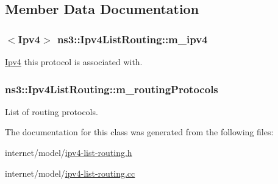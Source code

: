 \subsection{Member Data Documentation}
\subsubsection[{\texorpdfstring{m\+\_\+ipv4}{m_ipv4}}]{$<${\bf Ipv4}$>$ ns3\+::\+Ipv4\+List\+Routing\+::m\+\_\+ipv4\hspace{0.3cm}{\ttfamily [private]}}\hypertarget{classns3_1_1Ipv4ListRouting_aaf41416278c236de8b12028f91a40106}{}\label{classns3_1_1Ipv4ListRouting_aaf41416278c236de8b12028f91a40106}


\hyperlink{classns3_1_1Ipv4}{Ipv4} this protocol is associated with. 

\subsubsection[{\texorpdfstring{m\+\_\+routing\+Protocols}{m_routingProtocols}}]{ ns3\+::\+Ipv4\+List\+Routing\+::m\+\_\+routing\+Protocols\hspace{0.3cm}{\ttfamily [private]}}\hypertarget{classns3_1_1Ipv4ListRouting_a49de17cac4bf72e28b064bff3a93d29d}{}\label{classns3_1_1Ipv4ListRouting_a49de17cac4bf72e28b064bff3a93d29d}


List of routing protocols. 



The documentation for this class was generated from the following files\+:\begin{DoxyCompactItemize}
\item 
internet/model/\hyperlink{ipv4-list-routing_8h}{ipv4-\/list-\/routing.\+h}\item 
internet/model/\hyperlink{ipv4-list-routing_8cc}{ipv4-\/list-\/routing.\+cc}\end{DoxyCompactItemize}
